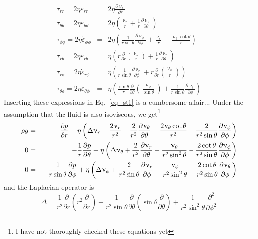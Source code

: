 \begin{eqnarray}
\tau_{rr} = 2 \eta \dot{\varepsilon}_{rr}  
&=&
2 \eta  \frac{\partial \upnu_r}{\partial r} \nonumber\\
\tau_{\theta\theta} = 2 \eta \dot{\varepsilon}_{\theta\theta} 
&=& 2\eta \left( \frac{\upnu_r}{r} + \frac{1}{r} \frac{\partial \upnu_\theta}{\partial \theta} \right)
\nonumber\\
\tau_{\phi\phi} = 2 \eta \dot{\varepsilon}_{\phi\phi}  
&=& 2\eta \left( 
 \frac{1}{r \sin\theta} \frac{\partial \upnu_\phi}{\partial \phi} +
\frac{\upnu_r}{r} +\frac{\upnu_\theta \cot \theta}{r}  \right)
\nonumber\\
\tau_{r\theta} =  2 \eta  \dot{\varepsilon}_{r\theta}
&=&
\eta \left( r \frac{\partial}{\partial r} (\frac{\upnu_\theta}{r} ) 
+\frac{1}{r} \frac{\partial \upnu_r}{\partial \theta} \right)
\nonumber\\
\tau_{r\phi} = 2 \eta  \dot{\varepsilon}_{r\phi}
&=&
\eta \left(  \frac{1}{r \sin\theta} \frac{\partial \upnu_r}{\partial \phi} 
+ r \frac{\partial }{\partial r} (\frac{\upnu_\phi}{r}) \right)
\nonumber\\
\tau_{\theta\phi} =  2 \eta  \dot{\varepsilon}_{\theta\phi} 
&=&
\eta \left( \frac{\sin \theta}{r} \frac{\partial }{\partial \theta} (\frac{\upnu_\phi}{\sin\theta}) + \frac{1}{r \sin\theta} \frac{\partial \upnu_\theta}{\partial \phi}    \right)
\nonumber
\end{eqnarray}
Inserting these expressions in Eq.~\eqref{eq_st1} is a cumbersome affair...
Under the assumption that the fluid is also isoviscous, 
we get\footnote{I have not thoroughly checked these equations yet} 
\begin{eqnarray}
\rho g
&=&
-\frac{\partial p}{\partial r} + \eta \left( \Delta \upnu_r - \frac{2\upnu_r}{r^2} 
-\frac{2}{r^2} \frac{\partial \upnu_\theta}{\partial \theta} - \frac{2 \upnu_\theta \cot \theta}{r^2}
-\frac{2}{r^2 \sin\theta} \frac{\partial \upnu_\phi}{\partial \phi}
\right) 
\nonumber\\
0
&=& 
-\frac{1}{r}\frac{\partial p}{\partial \theta} 
+\eta \left(
\Delta \upnu_\theta + \frac{2}{r^2} \frac{\partial \upnu_r}{\partial \theta}
-\frac{\upnu_\theta}{r^2 \sin^2\theta } -\frac{2 \cot \theta}{r^2 \sin\theta}
\frac{\partial \upnu_\phi}{\partial \phi}  
\right) 
\nonumber\\
0
&=& 
- \frac{1}{r \sin\theta} \frac{\partial p}{\partial \phi}  + \eta
\left(
\Delta \upnu_\phi + \frac{2}{r^2 \sin\theta} \frac{\partial \upnu_r}{\partial \phi}
-\frac{\upnu_\phi}{r^2 \sin^2 \theta} + \frac{2 \cot \theta}{r^2 \sin\theta}
\frac{\partial \upnu_\theta}{\partial \phi}
\right) \nonumber\\
\end{eqnarray}
and the Laplacian operator is   
\[
\Delta = \frac{1}{r^2} \frac{\partial }{\partial r}\left( r^2 \frac{\partial }{\partial r}\right)
+\frac{1}{r^2 \sin\theta} \frac{\partial }{\partial \theta}
\left(
\sin\theta \frac{\partial }{\partial\theta}
\right)
+ \frac{1}{r^2 \sin^2\theta} \frac{\partial^2 }{\partial\phi^2}
\]

